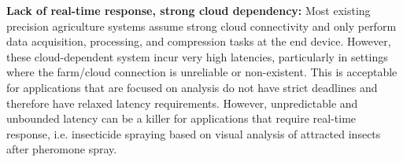 \noindent
\textbf{Lack of real-time response, strong cloud dependency:}
Most existing precision agriculture systems assume strong cloud connectivity and only perform data acquisition, processing, and compression tasks at the end device. However, these cloud-dependent system incur very high latencies, particularly in settings where the farm/cloud connection is unreliable or non-existent. This is acceptable for applications that are focused on analysis do not have strict deadlines and therefore have relaxed latency requirements. However, unpredictable and unbounded latency can be a killer for applications that require real-time response, i.e. insecticide spraying based on visual analysis of attracted insects after pheromone spray. 





